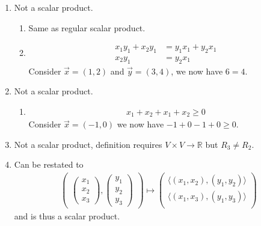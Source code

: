 \documentclass{article}
\begin{document}
\begin{enumerate}
    \item Not a scalar product.
    \begin{enumerate}[label=(\roman*)]
        \item Same as regular scalar product.
        
        \item \begin{align*}
            x_1y_1 + x_2y_1 &= y_1x_1 + y_2x_1 \\
            x_2y_1 &= y_2x_1 
        \end{align*}
        Consider $\vec{x} = (1, 2)$ and $\vec{y} = (3, 4)$, we now have $6 = 4$.
    \end{enumerate}

    \item Not a scalar product.
    \begin{enumerate}[label=(\roman*)]
        \item \begin{align*}
            x_1 + x_2 + x_1 + x_2 \geq 0
        \end{align*}
        Consider $\vec{x} = (-1, 0)$ we now have $-1 + 0 - 1 + 0 \geq 0$.
    \end{enumerate}

    \item Not a scalar product, definition requires $V \times V \rightarrow \mathbb{R}$ but $R_3 \neq R_2$.
    
    \item Can be restated to
    \begin{align*}
        \begin{pmatrix}
            \begin{pmatrix}
                x_1 \\ x_2 \\ x_3
            \end{pmatrix}, \begin{pmatrix}
                y_1 \\ y_2 \\ y_3
            \end{pmatrix}
        \end{pmatrix}
        \mapsto
        \begin{pmatrix}
            \langle (x_1,x_2),(y_1,y_2) \rangle \\
            \langle (x_1,x_3),(y_1,y_3) \rangle \\
        \end{pmatrix}
    \end{align*}
    and is thus a scalar product.
\end{enumerate}
\end{document}

